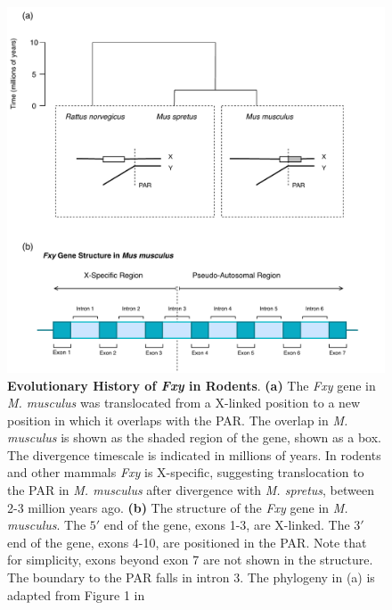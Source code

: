 \begin{figure}[htbp]
\centering
\includegraphics[width=\textwidth]{figures/diagrams/Fxy.pdf}
\caption{\textbf{Evolutionary History of \textit{Fxy} in Rodents}. \textbf{(a)} The \textit{Fxy} gene in \textit{M. musculus} was translocated from a X-linked position to a new position in which it overlaps with the PAR. The overlap in \textit{M. musculus} is shown as the shaded region of the gene, shown as a box. The divergence timescale is indicated in millions of years. In rodents and other mammals \textit{Fxy} is X-specific, suggesting translocation to the PAR in \textit{M. musculus} after divergence with \textit{M. spretus}, between 2-3 million years ago. \textbf{(b)} The structure of the \textit{Fxy} gene in \textit{M. musculus}. The $5'$ end of the gene, exons 1-3, are X-linked. The $3'$ end of the gene, exons 4-10, are positioned in the PAR. Note that for simplicity, exons beyond exon 7 are not shown in the structure. The boundary to the PAR falls in intron 3. The phylogeny in (a) is adapted from Figure 1 in \cite{Galtier2007AdaptationEvolution}}
\label{fig:Fxy}
\end{figure}